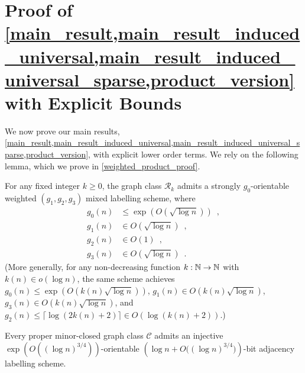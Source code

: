 \documentclass{patmorin}
\renewcommand{\ge}{\geqslant}
\renewcommand{\le}{\leqslant}
\newcommand{\Oh}{O}
\newcommand{\calC}{\mathcal{C}}
\newcommand{\calR}{\mathcal{R}}
\begin{document}
\section{Proof of \texorpdfstring{\cref{main_result,main_result_induced_universal,main_result_induced_universal_sparse,product_version}}{Theorems \ref*{main_result}, \ref*{main_result_induced_universal_sparse}, and \ref*{product_version}, and Corollary \ref*{main_result_induced_universal}} with Explicit Bounds}
\label{proof_main_result}

We now prove our main results, \cref{main_result,main_result_induced_universal,main_result_induced_universal_sparse,product_version}, with explicit lower order terms.  We rely on the following lemma, which we prove in \cref{weighted_product_proof}.
\begin{lem}\label{gk_labelling_precise}
  For any fixed integer $k\ge 0$, the graph class $\calR_{k}$ admits a strongly $g_0$-orientable weighted $(g_1,g_2,g_3)$ mixed labelling scheme, where
  \begin{align*}
  g_0(n)&\le \exp(\Oh(\sqrt{\log n})) \enspace ,\\ 
  g_1(n)&\in \Oh(\sqrt{\log n}) \enspace ,\\
  g_2(n)&\in \Oh(1) \enspace ,\\
  g_3(n)&\in \Oh(\sqrt{\log n}) \enspace .
\end{align*}
(More generally, for any non-decreasing function $k:\mathbb{N}\to\mathbb{N}$ with $k(n)\in o(\log n)$, the same scheme achieves $g_0(n)\le \exp(\Oh(k(n)\sqrt{\log n}))$, $g_1(n)\in \Oh(k(n)\sqrt{\log n})$, $g_3(n)\in \Oh(k(n)\sqrt{\log n})$, and $g_2(n)\le \lceil\log(2k(n)+2)\rceil\in \Oh(\log(k(n)+2))$.)
\end{lem} 


\begin{lem}
  \label{main_result_detailed}
  Every proper minor-closed graph class $\calC$ admits an injective $\exp(\Oh((\log n)^{3/4}))$-orientable $(\log n + \Oh\big((\log n)^{3/4}\big))$-bit adjacency labelling scheme.
\end{lem}
\end{document}
